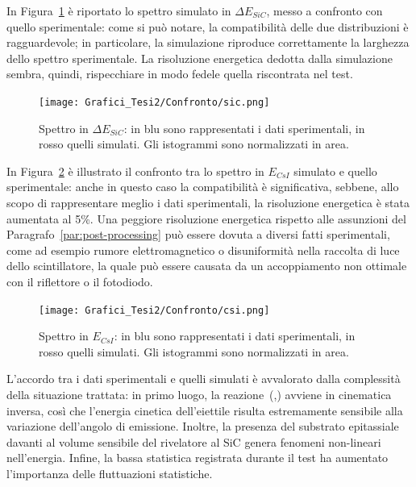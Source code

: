 In Figura~\ref{fig:spettro_sic_confronto} è riportato lo spettro simulato in $\Delta E_{SiC}$, messo a confronto con quello sperimentale: come si può notare, la compatibilità delle due distribuzioni è ragguardevole; in particolare, la simulazione riproduce correttamente la larghezza dello spettro sperimentale.
La risoluzione energetica dedotta dalla simulazione sembra, quindi, rispecchiare in modo fedele quella riscontrata nel test.
\begin{figure} [!p]
	\centering
	\texttt{[image: Grafici\_Tesi2/Confronto/sic.png]}
	\caption{Spettro in $\Delta E_{SiC}$: in blu sono rappresentati i dati sperimentali, in rosso quelli simulati. Gli istogrammi sono normalizzati in area.} \label{fig:spettro_sic_confronto}
\end{figure}

In Figura~\ref{fig:spettro_csi_confronto} è illustrato il confronto tra lo spettro in $E_{CsI}$ simulato e quello sperimentale: anche in questo caso la compatibilità è significativa, sebbene, allo scopo di rappresentare meglio i dati sperimentali, la risoluzione energetica è stata aumentata al 5\%.
Una peggiore risoluzione energetica rispetto alle assunzioni del Paragrafo~\ref{par:post-processing} può essere dovuta a diversi fatti sperimentali, come ad esempio rumore elettromagnetico o disuniformità nella raccolta di luce dello scintillatore, la quale può essere causata da un accoppiamento non ottimale con il riflettore o il fotodiodo.


\begin{figure} [!p]
	\centering
	\texttt{[image: Grafici\_Tesi2/Confronto/csi.png]}
	\caption{Spettro in $E_{CsI}$: in blu sono rappresentati i dati sperimentali, in rosso quelli simulati. Gli istogrammi sono normalizzati in area.} \label{fig:spettro_csi_confronto}
\end{figure}

L'accordo tra i dati sperimentali e quelli simulati è avvalorato dalla complessità della situazione trattata: in primo luogo, la reazione~(,) avviene in cinematica inversa, così che l'energia cinetica dell'eiettile risulta estremamente sensibile alla variazione dell'angolo di emissione. 
Inoltre, la presenza del substrato epitassiale davanti al volume sensibile del rivelatore al SiC genera fenomeni non-lineari nell'energia.
Infine, la bassa statistica registrata durante il test ha aumentato l'importanza delle fluttuazioni statistiche.

